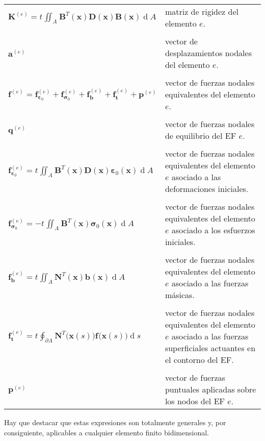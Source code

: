 \documentclass[12pt,letterpaper, landscape]{article}
\newcommand{\e}{{}}
\newcommand{\ve}[1]{{\boldsymbol{#1}}}
\newcommand{\ma}[1]{{\boldsymbol{#1}}}
\newcommand{\dd}{\operatorname{d} \!}
\begin{document}
\begin{tabular}{lp{14.2cm}}
   $\displaystyle \ma{K}^{(e)} = t^\e \iint_{A^\e}  \ma{B}^T(\ve{x})\ma{D}(\ve{x})\ma{B}(\ve{x}) \dd A$ & matriz de rigidez del elemento $e$.\\
   \\[-1ex]
   $\ve{a}^{(e)}$ & vector de desplazamientos nodales del elemento $e$.\\
   \\[-1ex]
   $\ma{f}^{(e)} = \ve{f}_{\ve{\varepsilon}_0}^{(e)} + \ve{f}_{\ve{\sigma}_0}^{(e)} + \ve{f}^{(e)}_\ve{b} + \ve{f}^{(e)}_\ve{t} + \ve{p}^{(e)}$     &  vector de fuerzas nodales equivalentes del elemento $e$.\\
   \\[-1ex]
   $\ve{q}^{(e)}$ & vector de fuerzas nodales de equilibrio del EF $e$.\\   
   \\[-1ex]
   $\displaystyle\ve{f}^{(e)}_{\ve{\varepsilon}_0} = t^\e \iint_{A^\e}  \ma{B}^T(\ve{x})\ma{D}(\ve{x})\ve{\varepsilon}_0(\ve{x}) \dd A$      & vector de fuerzas nodales equivalentes del elemento $e$ asociado a las deformaciones iniciales.\\
   \\[-1ex]   
   $\displaystyle \ve{f}^{(e)}_{\ve{\sigma}_0} = -t^\e \iint_{A^\e}  \ma{B}^T(\ve{x})\ve{\sigma}_0(\ve{x}) \dd A$ &vector de fuerzas nodales equivalentes del elemento $e$ asociado a los esfuerzos iniciales.\\
   \\[-1ex]
   $\displaystyle \ve{f}^{(e)}_\ve{b} = t^\e \iint_{A^\e}  \ma{N}^T(\ve{x}) \ve{b}^\e(\ve{x}) \dd A$ &vector de fuerzas nodales equivalentes del elemento $e$ asociado a las fuerzas másicas.\\
   \\[-1ex]
   $\displaystyle \ve{f}^{(e)}_\ve{t} = t^\e \oint_{\partial A^\e} \ma{N}^T\big(\ve{x}(s)\big) \ve{f}^\e\big(\ve{x}(s)\big) \dd s$ &vector de fuerzas nodales equivalentes del elemento $e$ asociado a las fuerzas superficiales actuantes en el contorno del EF.\\
\\[-1ex]   
   $\ve{p}^{(e)}$       & vector de fuerzas puntuales aplicadas sobre los nodos del EF $e$.
\end{tabular} 

\vspace{\baselineskip}\vspace{\baselineskip}
Hay que destacar que estas expresiones son totalmente generales y, por consiguiente, aplicables a cualquier elemento finito bidimensional.
\end{document}
